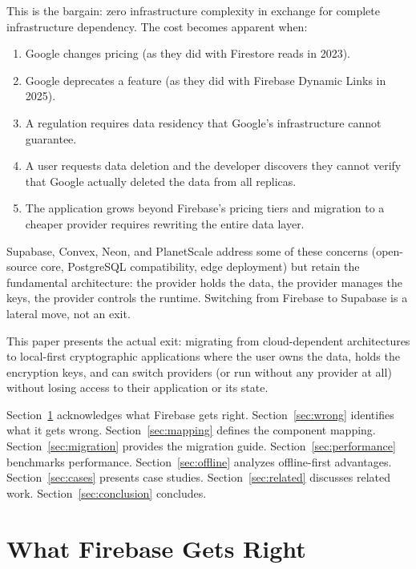 \documentclass[11pt,a4paper]{article}
\begin{document}
This is the bargain: zero infrastructure complexity in exchange for
complete infrastructure dependency. The cost becomes apparent when:

\begin{enumerate}[label=(\roman*)]
    \item Google changes pricing (as they did with Firestore reads in 2023).
    \item Google deprecates a feature (as they did with Firebase Dynamic Links in 2025).
    \item A regulation requires data residency that Google's infrastructure
    cannot guarantee.
    \item A user requests data deletion and the developer discovers they
    cannot verify that Google actually deleted the data from all replicas.
    \item The application grows beyond Firebase's pricing tiers and
    migration to a cheaper provider requires rewriting the entire data layer.
\end{enumerate}

Supabase, Convex, Neon, and PlanetScale address some of these concerns
(open-source core, PostgreSQL compatibility, edge deployment) but retain
the fundamental architecture: the provider holds the data, the provider
manages the keys, the provider controls the runtime. Switching from
Firebase to Supabase is a lateral move, not an exit.

This paper presents the actual exit: migrating from cloud-dependent
architectures to local-first cryptographic applications where the user
owns the data, holds the encryption keys, and can switch providers
(or run without any provider at all) without losing access to their
application or its state.

Section~\ref{sec:right} acknowledges what Firebase gets right.
Section~\ref{sec:wrong} identifies what it gets wrong.
Section~\ref{sec:mapping} defines the component mapping.
Section~\ref{sec:migration} provides the migration guide.
Section~\ref{sec:performance} benchmarks performance.
Section~\ref{sec:offline} analyzes offline-first advantages.
Section~\ref{sec:cases} presents case studies.
Section~\ref{sec:related} discusses related work.
Section~\ref{sec:conclusion} concludes.

\section{What Firebase Gets Right}\label{sec:right}
\end{document}
